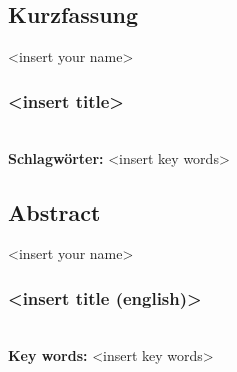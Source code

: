 
\subsection*{Kurzfassung}

<insert your name>
\subsubsection*{<insert title>}


%
\mbox{}\\[0.5\baselineskip]\noindent
\textbf{Schlagwörter:} 
<insert key words>
\clearpage
\subsection*{Abstract}

<insert your name>
\subsubsection*{<insert title (english)>}


%
\mbox{}\\[0.5\baselineskip]\noindent
\textbf{Key words:} 
<insert key words>